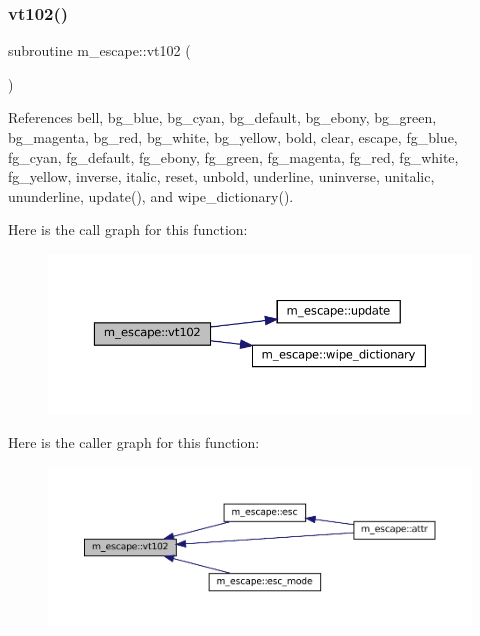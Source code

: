 \subsubsection{\texorpdfstring{vt102()}{vt102()}}
{\footnotesize\ttfamily subroutine m\+\_\+escape\+::vt102 (\begin{DoxyParamCaption}{ }\end{DoxyParamCaption})\hspace{0.3cm}{\ttfamily [private]}}



References bell, bg\+\_\+blue, bg\+\_\+cyan, bg\+\_\+default, bg\+\_\+ebony, bg\+\_\+green, bg\+\_\+magenta, bg\+\_\+red, bg\+\_\+white, bg\+\_\+yellow, bold, clear, escape, fg\+\_\+blue, fg\+\_\+cyan, fg\+\_\+default, fg\+\_\+ebony, fg\+\_\+green, fg\+\_\+magenta, fg\+\_\+red, fg\+\_\+white, fg\+\_\+yellow, inverse, italic, reset, unbold, underline, uninverse, unitalic, ununderline, update(), and wipe\+\_\+dictionary().

Here is the call graph for this function\+:\nopagebreak
\begin{figure}[H]
\begin{center}
\leavevmode
\includegraphics[width=350pt]{namespacem__escape_ae9d40717b2e75e90e2505d5fed6435c5_cgraph}
\end{center}
\end{figure}
Here is the caller graph for this function\+:\nopagebreak
\begin{figure}[H]
\begin{center}
\leavevmode
\includegraphics[width=350pt]{namespacem__escape_ae9d40717b2e75e90e2505d5fed6435c5_icgraph}
\end{center}
\end{figure}
\mbox{\label{namespacem__escape_a1bc574bc97157fe67d868d2bd180c91e}} 
